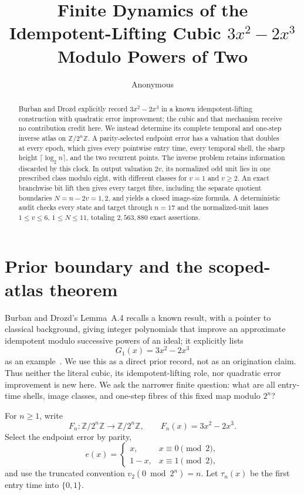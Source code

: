 \documentclass[a4paper,10pt]{amsart}
\title[Temporal and inverse atlas of an idempotent-lifting cubic]{Finite Dynamics of the Idempotent-Lifting Cubic $3x^2-2x^3$ Modulo Powers of Two}
\author{Anonymous}
\date{}
\theoremstyle{remark}
\newcommand{\Zn}{\mathbb Z/2^n\mathbb Z}
\newcommand{\vtwo}{v_2}
\begin{document}
\begin{abstract}
Burban and Drozd explicitly record $3x^2-2x^3$ in a known
idempotent-lifting construction with quadratic error improvement; the cubic
and that mechanism receive no contribution credit here.  We instead determine
its complete temporal and one-step inverse atlas on
$\mathbb Z/2^n\mathbb Z$.  A
parity-selected endpoint error has a valuation that doubles at every epoch,
which gives every pointwise entry time, every temporal shell, the sharp
height $\lceil\log_2 n\rceil$, and the two recurrent points.  The inverse
problem retains information discarded by this clock.  In output valuation
$2v$, its normalized odd unit lies in one prescribed class modulo eight,
with different classes for $v=1$ and $v\geq2$.  An exact branchwise bit lift
then gives every target fibre, including the separate quotient boundaries
$N=n-2v=1,2$, and yields a closed image-size formula.  A deterministic audit
checks every state and target through $n=17$ and the normalized-unit lanes
$1\leq v\leq6$, $1\leq N\leq11$, totaling $2{,}563{,}880$ exact assertions.
\end{abstract}

\maketitle

\section{Prior boundary and the scoped-atlas theorem}\label{sec:theorem}

Burban and Drozd's Lemma~A.4 recalls a known result, with a pointer to
classical background, giving integer polynomials that improve an approximate
idempotent modulo successive powers of an ideal; it explicitly lists
\[
 G_1(x)=3x^2-2x^3
\]
as an example~\cite{BurbanDrozd2004}.  We use this as a direct prior record,
not as an origination claim.  Thus neither the literal cubic, its
idempotent-lifting role, nor quadratic error improvement is new here.  We ask
the narrower finite question: what are all entry-time shells, image classes,
and one-step fibres of this fixed map modulo $2^n$?

For $n\geq1$, write
\[
 F_n:\Zn\longrightarrow\Zn,
 \qquad F_n(x)=3x^2-2x^3.
\]
Select the endpoint error by parity,
\begin{equation}\label{eq:error}
 e(x)=\begin{cases}x,&x\equiv0\pmod2,\\1-x,&x\equiv1\pmod2,\end{cases}
\end{equation}
and use the truncated convention $\vtwo(0\bmod 2^n)=n$.  Let
$\tau_n(x)$ be the first entry time into $\{0,1\}$.
\end{document}
